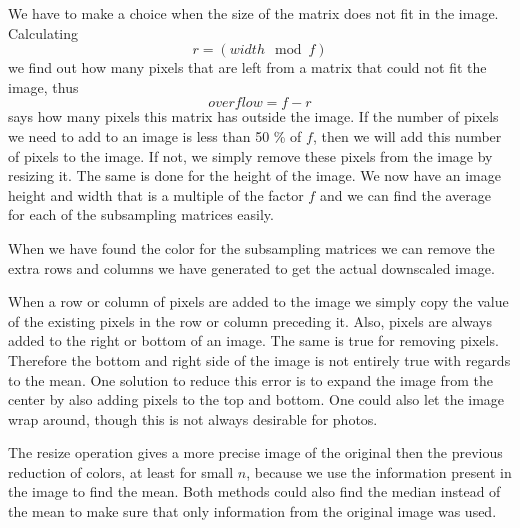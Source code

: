 \documentclass[a4paper, 10pt, final]{article}
\begin{document}
We have to make a choice when the size of the matrix does not fit in the
image. Calculating
\[
r = (width \mod f)
\]
we find out how many pixels that are left from a matrix that could not
fit the image, thus
\[
overflow = f - r
\]
says how many pixels this matrix has outside the image. If the number of
pixels we need to add to an image is less than 50 \% of $f$, then we
will add this number of pixels to the image. If not, we simply remove
these pixels from the image by resizing it. The same is done for the
height of the image. We now have an image height and width that is a
multiple of the factor $f$ and we can find the average for each of the
subsampling matrices easily.

When we have found the color for the subsampling matrices we can remove
the extra rows and columns we have generated to get the actual
downscaled image.

When a row or column of pixels are added to the image we simply copy the
value of the existing pixels in the row or column preceding it. Also,
pixels are always added to the right or bottom of an image. The same is
true for removing pixels. Therefore the bottom and right side of the
image is not entirely true with regards to the mean. One solution to
reduce this error is to expand the image from the center by also
adding pixels to the top and bottom. One could also let the image wrap
around, though this is not always desirable for photos.

The resize operation gives a more precise image of the original then the
previous reduction of colors, at least for small $n$, because we use the
information present in the image to find the mean. Both methods could
also find the median instead of the mean to make sure that only
information from the original image was used.
\end{document}
